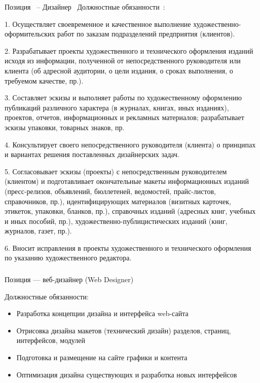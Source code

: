\documentclass{../industrial-development}
\begin{document}
Позиция~\cite{hh} – Дизайнер~\cite{itcf}
Должностные обязанности~\cite{rab}:

1.	Осуществляет своевременное и качественное выполнение художественно-оформительских работ по заказам подразделений предприятия (клиентов).

2.	Разрабатывает проекты художественного и технического оформления изданий исходя из информации, полученной от непосредственного руководителя или клиента (об адресной аудитории, о цели издания, о сроках выполнения, о требуемом качестве, пр.).

3.	Составляет эскизы и выполняет работы по художественному оформлению публикаций различного характера (в журналах, книгах, иных изданиях), проектов, отчетов, информационных и рекламных материалов; разрабатывает эскизы упаковки, товарных знаков, пр.

4.	Консультирует своего непосредственного руководителя (клиента) о принципах и вариантах решения поставленных дизайнерских задач.

5.	Согласовывает эскизы (проекты) с непосредственным руководителем (клиентом) и подготавливает окончательные макеты информационных изданий (пресс-релизов, объявлений, бюллетеней, ведомостей, прайс-листов, справочников, пр.), идентифицирующих материалов (визитных карточек, этикеток, упаковки, бланков, пр.), справочных изданий (адресных книг, учебных и иных пособий, пр.), художественно-публицистических изданий (книг, журналов, газет, пр.).

6.	Вносит исправления в проекты художественного и технического оформления по указанию художественного редактора.

\begin{frame} \frametitle{}
 \begin{block}{}
  \alert{Позиция --- веб-дизайнер (Web Designer)}

Должностные обязанности: 
  \end{block}
  \begin{itemize}
  \item   Разработка концепции дизайна и интерфейса web-сайта
  \item  Отрисовка дизайна макетов (технический дизайн) разделов, страниц, интерфейсов, модулей
  \item Подготовка и размещение на сайте графики и контента
 \item Оптимизация дизайна существующих и разработка новых интерфейсов
  \end{itemize}
\end{frame}
\end{document}

